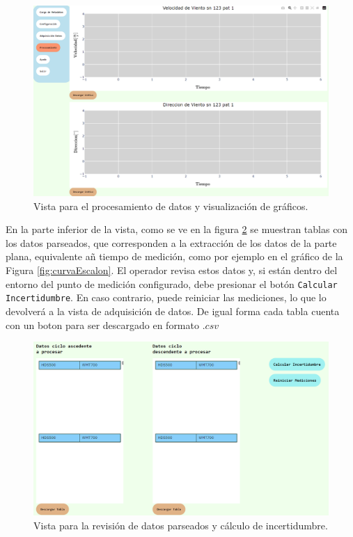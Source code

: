 \begin{figure}[H]
    \centering
    \includegraphics[width=1.1\linewidth]{Figuras/AplicacionWeb/frondend/procesarDatos1.png}
    \caption{Vista para el procesamiento de datos y visualización de gráficos.}
    \label{fig:procesarDatos1}
\end{figure}

En la parte inferior de la vista, como se ve en la figura \ref{fig:procesarDatos2} se muestran tablas con los datos parseados, que corresponden a la extracción de los datos de la parte plana, equivalente añ tiempo de medición, como por ejemplo en el gráfico de la Figura \ref{fig:curvaEscalon}. El operador revisa estos datos y, si están dentro del entorno del punto de medición configurado, debe presionar el botón \texttt{Calcular Incertidumbre}. En caso contrario, puede reiniciar las mediciones, lo que lo devolverá a la vista de adquisición de datos. De igual forma cada tabla cuenta con un boton para ser descargado en formato $.csv$

\begin{figure}[H]
    \centering
    \includegraphics[width=0.9\linewidth]{Figuras/AplicacionWeb/frondend/procesarDatos2.png}
    \caption{Vista para la revisión de datos parseados y cálculo de incertidumbre.}
    \label{fig:procesarDatos2}
\end{figure}



